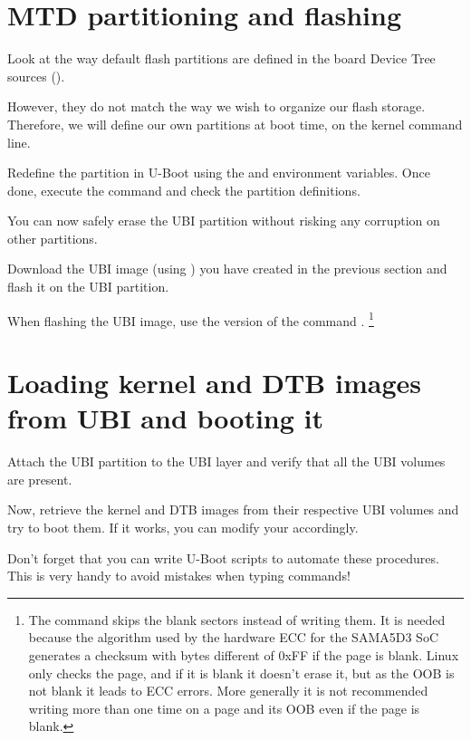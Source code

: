 %
%
%

\section{MTD partitioning and flashing}

Look at the way default flash partitions are defined in the board
Device Tree sources
().

However, they do not match the way we wish to organize our flash
storage. Therefore, we will define our own partitions at boot time,
on the kernel command line.

Redefine the partition in U-Boot using the  and
 environment variables.
Once done, execute the  command and check the partition
definitions.

You can now safely erase the UBI partition without risking any
corruption on other partitions.

Download the UBI image (using ) you have created in the
previous section and flash it on the UBI partition.

When flashing the UBI image, use the  version of the
command .
\footnote{The command  skips
  the blank sectors instead of writing them. It is needed because the
  algorithm used by the hardware ECC for the SAMA5D3 SoC generates a
  checksum with bytes different of 0xFF if the page is blank. Linux
  only checks the page, and if it is blank it doesn't erase it, but as
  the OOB is not blank it leads to ECC errors. More generally it is
  not recommended writing more than one time on a page and its OOB
  even if the page is blank.}

\section{Loading kernel and DTB images from UBI and booting it}

Attach the UBI partition to the UBI layer and verify that all the
UBI volumes are present.

Now, retrieve the kernel and DTB images from their respective UBI
volumes and try to boot them. If it works, you can modify your
 accordingly.


Don't forget that you can write U-Boot scripts to automate these
procedures. This is very handy to avoid mistakes when typing commands!

